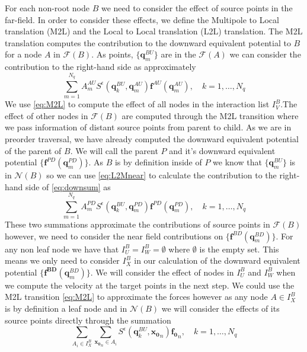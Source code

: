 For each non-root node $B$ we need to consider the effect of source points in the far-field. In order to consider these effects, we define the Multipole to Local translation (M2L) and the Local to Local translation (L2L) translation. The M2L translation computes the contribution to the downward equivalent potential to $B$ for a node $A$ in $\mathcal{F}(B)$. As points, $\{\bm{q}^{BU}_m\}$ are in the $\mathcal{F}(A)$ we can consider the contribution to the right-hand side as approximately 
\begin{equation}
\label{eq:M2L}
\sum_{m=1}^{N_{q}} A_{m}^{A U} S^\epsilon\left(\bm{q}_{k}^{B U}, \bm{q}_{m}^{A U}\right) \bm{f}^{A U}\left(\bm{q}_{m}^{A U}\right), \quad k=1,\dots,N_q
\end{equation}
We use \cref{eq:M2L} to compute the effect of all nodes in the interaction list $I_V^B$.The effect of other nodes in $\mathcal{F}(B)$ are computed through the M2L transition where we pass information of distant source points from parent to child. As we are in preorder traversal, we have already computed the downward equivalent potential of the parent of $B$. We will call the parent $P$ and it's downward equivalent potential $\{\bm{f}^{PD}(\bm{q}^{PD}_m)\}$. As $B$ is by definition inside of $P$ we know that $\{\bm{q}^{BU}_m\}$ is in $\mathcal{N}(B)$ so we can use \cref{eq:L2Mnear} to calculate the contribution to the right-hand side of \cref{eq:downsum} as
\begin{equation}
\label{eq:L2L}
\sum_{m=1}^{N_{q}} A_{m}^{P D} S^\epsilon\left(\bm{q}_{k}^{B U}, \bm{q}_{m}^{P D}\right) \bm{f}^{P D}\left(\bm{q}_{m}^{P D}\right), \quad k=1,\dots,N_q
\end{equation}
These two summations approximate the contributions of source points in $\mathcal{F}(B)$ however, we need to consider the near field contributions on $\{\bm{f}^{B D}(\bm{q}^{BD}_m)\}$. For any non leaf node we have that $I_U^B = I_W^B = \emptyset$ where $\emptyset$ is the empty set. This means we only need to consider $I_X^B$ in our calculation of the downward equivalent potential $\{\bm{f^{BD}}(\bm{q}^{BD}_m)\}$. We will consider the effect of nodes in $I_U^B$ and $I_W^B$ when we compute the velocity at the target points in the next step. We could use the M2L transition \cref{eq:M2L} to approximate the forces  however as any node $A \in I_X^B$ is by definition a leaf node and in $\mathcal{N}(B)$ we will consider the effects of its source points directly through the summation
\begin{equation}
\label{eq:X}
    \sum_{A_i \in I_X^B} \sum_{{\bm{x_0}}_n\in A_i} S^\epsilon\left(\bm{q}^{BU}_{k}, {\bm{x_0}}_{n}\right) {\bm{f_0}}_{n}, \quad k=1,\dots,N_q
\end{equation}

